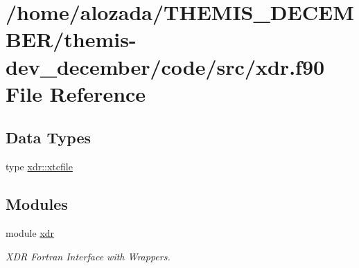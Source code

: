 \hypertarget{xdr_8f90}{}\section{/home/alozada/\+T\+H\+E\+M\+I\+S\+\_\+\+D\+E\+C\+E\+M\+B\+E\+R/themis-\/dev\+\_\+december/code/src/xdr.f90 File Reference}
\label{xdr_8f90}
\subsection*{Data Types}
\begin{DoxyCompactItemize}
\item 
type \hyperlink{structxdr_1_1xtcfile}{xdr\+::xtcfile}
\end{DoxyCompactItemize}
\subsection*{Modules}
\begin{DoxyCompactItemize}
\item 
module \hyperlink{namespacexdr}{xdr}
\begin{DoxyCompactList}\small\item\em X\+DR Fortran Interface with Wrappers. \end{DoxyCompactList}\end{DoxyCompactItemize}
